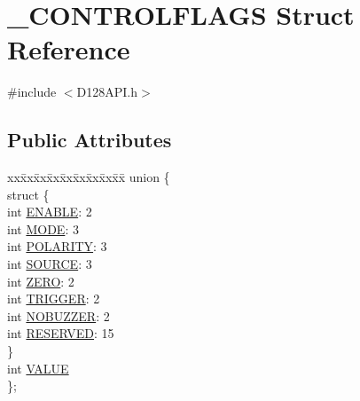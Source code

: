 \hypertarget{struct___c_o_n_t_r_o_l_f_l_a_g_s}{}\section{\+\_\+\+C\+O\+N\+T\+R\+O\+L\+F\+L\+A\+GS Struct Reference}
\label{struct___c_o_n_t_r_o_l_f_l_a_g_s}


{\ttfamily \#include $<$D128\+A\+P\+I.\+h$>$}

\subsection*{Public Attributes}
\begin{DoxyCompactItemize}
\item 
\begin{tabbing}
xx\=xx\=xx\=xx\=xx\=xx\=xx\=xx\=xx\=\kill
union \{\\
\>struct \{\\
\>\>int \hyperlink{struct___c_o_n_t_r_o_l_f_l_a_g_s_a0b08d40d70aaa5f55426e69592bf21eb}{ENABLE}: 2\\
\>\>int \hyperlink{struct___c_o_n_t_r_o_l_f_l_a_g_s_a3218761fa21750201e58d9758bb27f9b}{MODE}: 3\\
\>\>int \hyperlink{struct___c_o_n_t_r_o_l_f_l_a_g_s_ad8b89654d38cf57b2cec0c60f88cf038}{POLARITY}: 3\\
\>\>int \hyperlink{struct___c_o_n_t_r_o_l_f_l_a_g_s_a66972593eedd6fe707dd19f7b34671a1}{SOURCE}: 3\\
\>\>int \hyperlink{struct___c_o_n_t_r_o_l_f_l_a_g_s_aa7afe08fe584784481bb027e2312969f}{ZERO}: 2\\
\>\>int \hyperlink{struct___c_o_n_t_r_o_l_f_l_a_g_s_a5eda8877eab8d7deec65dd82539ca59e}{TRIGGER}: 2\\
\>\>int \hyperlink{struct___c_o_n_t_r_o_l_f_l_a_g_s_ac7a9bfa388fac51efb1f310f4d2f7a7d}{NOBUZZER}: 2\\
\>\>int \hyperlink{struct___c_o_n_t_r_o_l_f_l_a_g_s_a1b2f033384df0b109a6a2c81bda6ecfb}{RESERVED}: 15\\
\>\} \\
\>int \hyperlink{struct___c_o_n_t_r_o_l_f_l_a_g_s_a07bb2d8064c31cb7ea97be4eec07b008}{VALUE}\\
\}; \\

\end{tabbing}\end{DoxyCompactItemize}


